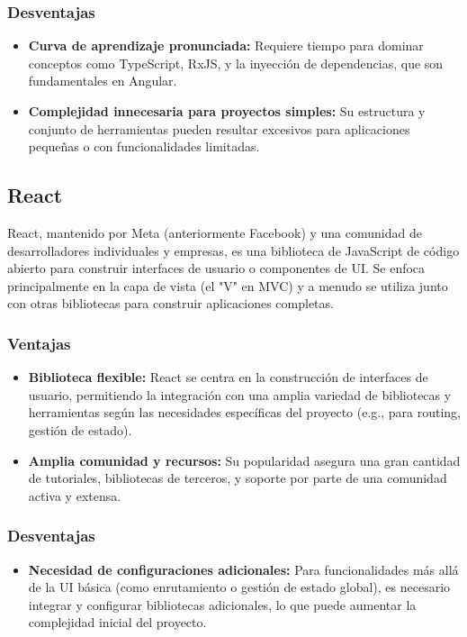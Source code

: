 \subsubsection{Desventajas}
\begin{itemize}
\item \textbf{Curva de aprendizaje pronunciada:} Requiere tiempo para dominar conceptos como TypeScript, RxJS, y la inyección de dependencias, que son fundamentales en Angular.
\item \textbf{Complejidad innecesaria para proyectos simples:} Su estructura y conjunto de herramientas pueden resultar excesivos para aplicaciones pequeñas o con funcionalidades limitadas.
\end{itemize}

\subsection{React}
React, mantenido por Meta (anteriormente Facebook) y una comunidad de desarrolladores individuales y empresas, es una biblioteca de JavaScript de código abierto para construir interfaces de usuario o componentes de UI. Se enfoca principalmente en la capa de vista (el "V" en MVC) y a menudo se utiliza junto con otras bibliotecas para construir aplicaciones completas.

\subsubsection{Ventajas}
\begin{itemize}
\item \textbf{Biblioteca flexible:} React se centra en la construcción de interfaces de usuario, permitiendo la integración con una amplia variedad de bibliotecas y herramientas según las necesidades específicas del proyecto (e.g., para routing, gestión de estado).
\item \textbf{Amplia comunidad y recursos:} Su popularidad asegura una gran cantidad de tutoriales, bibliotecas de terceros, y soporte por parte de una comunidad activa y extensa.
\end{itemize}

\subsubsection{Desventajas}
\begin{itemize}
\item \textbf{Necesidad de configuraciones adicionales:} Para funcionalidades más allá de la UI básica (como enrutamiento o gestión de estado global), es necesario integrar y configurar bibliotecas adicionales, lo que puede aumentar la complejidad inicial del proyecto.
\end{itemize}

